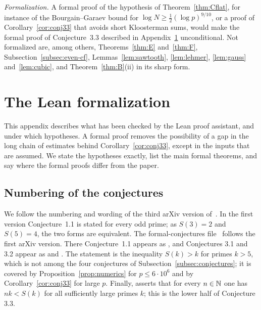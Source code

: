 \textit{Formalization.} A formal proof of the hypothesis of Theorem~\ref{thm:Cflat}, for instance of the Bourgain--Garaev bound for $\log N\ge\frac12(\log p)^{9/10}$, or a proof of Corollary~\ref{cor:conj33} that avoids short Kloosterman sums, would make the formal proof of Conjecture~3.3 described in Appendix~\ref{app:lean} unconditional. Not formalized are, among others, Theorems~\ref{thm:E} and~\ref{thm:F}, Subsection~\ref{subsec:even-cf}, Lemmas~\ref{lem:sawtooth}, \ref{lem:lehmer}, \ref{lem:gauss} and~\ref{lem:cubic}, and Theorem~\ref{thm:B}(ii) in its sharp form.

\appendix

\section{The Lean formalization}\label{app:lean}

This appendix describes what has been checked by the Lean proof assistant, and under which hypotheses. A formal proof removes the possibility of a gap in the long chain of estimates behind Corollary~\ref{cor:conj33}, except in the inputs that are assumed. We state the hypotheses exactly, list the main formal theorems, and say where the formal proofs differ from the paper.

\subsection*{Numbering of the conjectures}
We follow the numbering and wording of the third arXiv version of~\cite{b1}. In the first version Conjecture~1.1 is stated for every odd prime; as $S(3)=2$ and $S(5)=4$, the two forms are equivalent. The formal-conjectures file~\cite{b11} follows the first arXiv version. There Conjecture~1.1 appears as , and Conjectures 3.1 and 3.2 appear as  and . The statement  is the inequality $S(k)>k$ for primes $k>5$, which is not among the four conjectures of Subsection~\ref{subsec:conjectures}; it is covered by Proposition~\ref{prop:numerics} for $p\le6\cdot10^6$ and by Corollary~\ref{cor:conj33} for large $p$. Finally,  asserts that for every $n\in\mathbb{N}$ one has $nk<S(k)$ for all sufficiently large primes $k$; this is the lower half of Conjecture 3.3.

